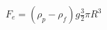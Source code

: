 \documentclass[preview]{standalone}
\begin{document}
\begin{center}
$F_e = (\rho_p - \rho_f)g\frac{3}{2} \pi R^3$
\end{center}
\end{document}
